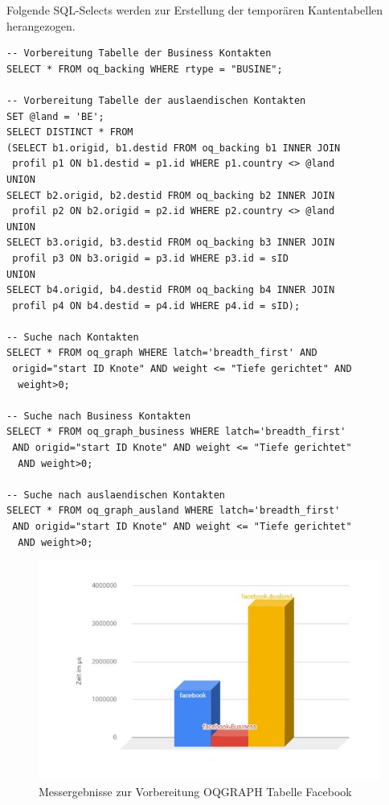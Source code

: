 Folgende SQL-Selects werden zur Erstellung der temporären Kantentabellen herangezogen.
\begin{lstlisting}
-- Vorbereitung Tabelle der Business Kontakten
SELECT * FROM oq_backing WHERE rtype = "BUSINE";

-- Vorbereitung Tabelle der auslaendischen Kontakten
SET @land = 'BE';
SELECT DISTINCT * FROM 
(SELECT b1.origid, b1.destid FROM oq_backing b1 INNER JOIN
 profil p1 ON b1.destid = p1.id WHERE p1.country <> @land
UNION
SELECT b2.origid, b2.destid FROM oq_backing b2 INNER JOIN
 profil p2 ON b2.origid = p2.id WHERE p2.country <> @land
UNION
SELECT b3.origid, b3.destid FROM oq_backing b3 INNER JOIN
 profil p3 ON b3.origid = p3.id WHERE p3.id = sID
UNION
SELECT b4.origid, b4.destid FROM oq_backing b4 INNER JOIN
 profil p4 ON b4.destid = p4.id WHERE p4.id = sID);
 
-- Suche nach Kontakten
SELECT * FROM oq_graph WHERE latch='breadth_first' AND
 origid="start ID Knote" AND weight <= "Tiefe gerichtet" AND
  weight>0;
  
-- Suche nach Business Kontakten
SELECT * FROM oq_graph_business WHERE latch='breadth_first'
 AND origid="start ID Knote" AND weight <= "Tiefe gerichtet"
  AND weight>0;
  
-- Suche nach auslaendischen Kontakten
SELECT * FROM oq_graph_ausland WHERE latch='breadth_first'
 AND origid="start ID Knote" AND weight <= "Tiefe gerichtet"
  AND weight>0;
\end{lstlisting}


\begin{figure}
	\centering
	\includegraphics[width=\textwidth]{images/facevor.jpg}
	\caption{Messergebnisse zur Vorbereitung OQGRAPH Tabelle Facebook}
	\label{fig:facevor}
\end{figure}

